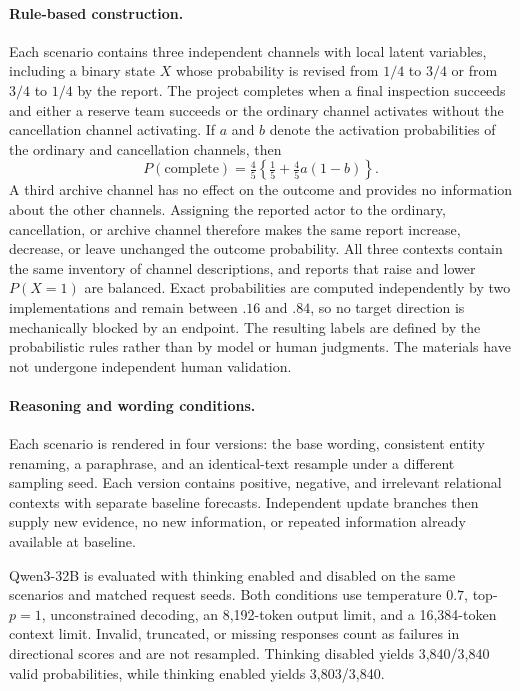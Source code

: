 \paragraph{Rule-based construction.}

Each scenario contains three independent channels with local latent variables, including a binary state $X$ whose probability is revised from $1/4$ to $3/4$ or from $3/4$ to $1/4$ by the report.
The project completes when a final inspection succeeds and either a reserve team succeeds or the ordinary channel activates without the cancellation channel activating.
If $a$ and $b$ denote the activation probabilities of the ordinary and cancellation channels, then
\[
P(\mathrm{complete})
=
\tfrac45\left\{\tfrac15+\tfrac45a(1-b)\right\}.
\]
A third archive channel has no effect on the outcome and provides no information about the other channels.
Assigning the reported actor to the ordinary, cancellation, or archive channel therefore makes the same report increase, decrease, or leave unchanged the outcome probability.
All three contexts contain the same inventory of channel descriptions, and reports that raise and lower $P(X=1)$ are balanced.
Exact probabilities are computed independently by two implementations and remain between $.16$ and $.84$, so no target direction is mechanically blocked by an endpoint.
The resulting labels are defined by the probabilistic rules rather than by model or human judgments.
The materials have not undergone independent human validation.

\paragraph{Reasoning and wording conditions.}

Each scenario is rendered in four versions: the base wording, consistent entity renaming, a paraphrase, and an identical-text resample under a different sampling seed.
Each version contains positive, negative, and irrelevant relational contexts with separate baseline forecasts.
Independent update branches then supply new evidence, no new information, or repeated information already available at baseline.

Qwen3-32B is evaluated with thinking enabled and disabled on the same scenarios and matched request seeds.
Both conditions use temperature $0.7$, top-$p=1$, unconstrained decoding, an 8,192-token output limit, and a 16,384-token context limit.
Invalid, truncated, or missing responses count as failures in directional scores and are not resampled.
Thinking disabled yields 3,840/3,840 valid probabilities, while thinking enabled yields 3,803/3,840.

